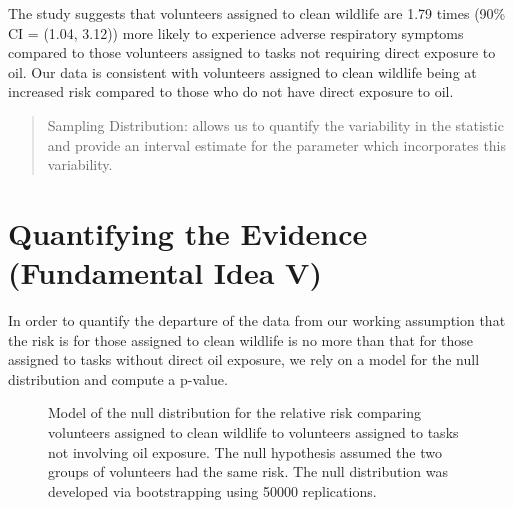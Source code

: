 \documentclass[
  letterpaper,
  DIV=11,
  numbers=noendperiod]{scrreprt}
\theoremstyle{plain}
\theoremstyle{definition}
\theoremstyle{definition}
\theoremstyle{remark}
\begin{document}
The study suggests that volunteers assigned to clean wildlife are 1.79
times (90\% CI = (1.04, 3.12)) more likely to experience adverse
respiratory symptoms compared to those volunteers assigned to tasks not
requiring direct exposure to oil. Our data is consistent with volunteers
assigned to clean wildlife being at increased risk compared to those who
do not have direct exposure to oil.

\begin{quote}
Sampling Distribution: allows us to quantify the variability in the
statistic and provide an interval estimate for the parameter which
incorporates this variability.
\end{quote}

\section{Quantifying the Evidence (Fundamental Idea
V)}\label{quantifying-the-evidence-fundamental-idea-v}

In order to quantify the departure of the data from our working
assumption that the risk is for those assigned to clean wildlife is no
more than that for those assigned to tasks without direct oil exposure,
we rely on a model for the null distribution and compute a p-value.

\begin{figure}


\caption{\label{fig-recaplanguage-null-distribution}Model of the null
distribution for the relative risk comparing volunteers assigned to
clean wildlife to volunteers assigned to tasks not involving oil
exposure. The null hypothesis assumed the two groups of volunteers had
the same risk. The null distribution was developed via bootstrapping
using 50000 replications.}

\end{figure}%
\end{document}
